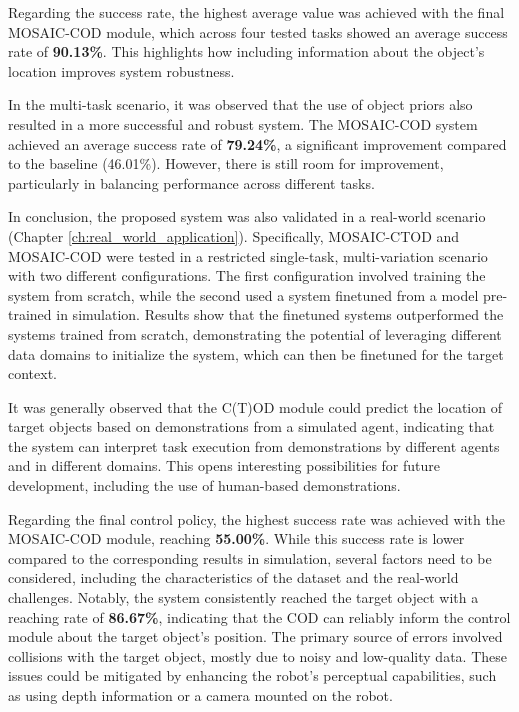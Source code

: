Regarding the success rate, the highest average value was achieved with the final MOSAIC-COD module, which across four tested tasks showed an average success rate of \textbf{90.13\%}. This highlights how including information about the object's location improves system robustness. 

In the multi-task scenario, it was observed that the use of object priors also resulted in a more successful and robust system. The MOSAIC-COD system achieved an average success rate of \textbf{79.24\%}, a significant improvement compared to the baseline (46.01\%). However, there is still room for improvement, particularly in balancing performance across different tasks.

In conclusion, the proposed system was also validated in a real-world scenario (Chapter \ref{ch:real_world_application}). Specifically, MOSAIC-CTOD and MOSAIC-COD were tested in a restricted single-task, multi-variation scenario with two different configurations. The first configuration involved training the system from scratch, while the second used a system finetuned from a model pre-trained in simulation. Results show that the finetuned systems outperformed the systems trained from scratch, demonstrating the potential of leveraging different data domains to initialize the system, which can then be finetuned for the target context.

It was generally observed that the C(T)OD module could predict the location of target objects based on demonstrations from a simulated agent, indicating that the system can interpret task execution from demonstrations by different agents and in different domains. This opens interesting possibilities for future development, including the use of human-based demonstrations.

Regarding the final control policy, the highest success rate was achieved with the MOSAIC-COD module, reaching \textbf{55.00\%}. While this success rate is lower compared to the corresponding results in simulation, several factors need to be considered, including the characteristics of the dataset and the real-world challenges. Notably, the system consistently reached the target object with a reaching rate of \textbf{86.67\%}, indicating that the COD can reliably inform the control module about the target object's position. The primary source of errors involved collisions with the target object, mostly due to noisy and low-quality data. These issues could be mitigated by enhancing the robot's perceptual capabilities, such as using depth information or a camera mounted on the robot.

